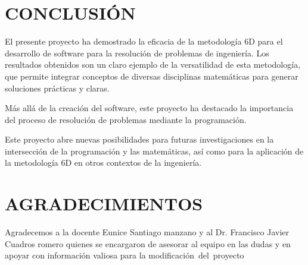 \documentclass{IEEEcsmag}
\begin{document}
\section{CONCLUSIÓN}

El presente proyecto ha demostrado la eficacia de la metodología 6D para el desarrollo de software para la resolución de problemas de ingeniería. Los resultados obtenidos son un claro ejemplo de la versatilidad de esta metodología, que permite integrar conceptos de diversas disciplinas matemáticas para generar soluciones prácticas y claras.

Más allá de la creación del software, este proyecto ha destacado la importancia del proceso de resolución de problemas mediante la programación.

Este proyecto abre nuevas posibilidades para futuras investigaciones en la intersección de la programación y las matemáticas, así como para la aplicación de la metodología 6D en otros contextos de la ingeniería.
\vspace*{-8pt}


\section{AGRADECIMIENTOS}
Agradecemos a la docente Eunice Santiago manzano y al Dr. Francisco Javier Cuadros romero quienes se encargaron de asesorar al equipo en las dudas y en apoyar con información valiosa para la modificación del proyecto
\end{document}

